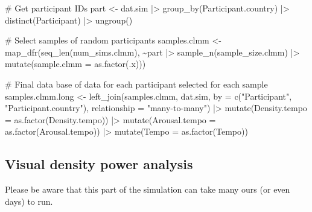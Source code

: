 \documentclass[
  bookmarksnumbered]{article}
\newenvironment{Shaded}{\begin{snugshade}}{\end{snugshade}}
\newcommand{\AttributeTok}[1]{\textcolor[rgb]{0.80,0.80,0.80}{#1}}
\newcommand{\CommentTok}[1]{\textcolor[rgb]{0.50,0.62,0.50}{#1}}
\newcommand{\FunctionTok}[1]{\textcolor[rgb]{0.94,0.94,0.56}{#1}}
\newcommand{\NormalTok}[1]{\textcolor[rgb]{0.80,0.80,0.80}{#1}}
\newcommand{\OtherTok}[1]{\textcolor[rgb]{0.94,0.94,0.56}{#1}}
\newcommand{\SpecialCharTok}[1]{\textcolor[rgb]{0.86,0.64,0.64}{#1}}
\newcommand{\StringTok}[1]{\textcolor[rgb]{0.80,0.58,0.58}{#1}}
\begin{document}
\begin{Shaded}
\begin{Highlighting}[]
\CommentTok{\# Get participant IDs}
\NormalTok{part }\OtherTok{\textless{}{-}}\NormalTok{ dat.sim  }\SpecialCharTok{|\textgreater{}} 
  \FunctionTok{group\_by}\NormalTok{(Participant.country) }\SpecialCharTok{|\textgreater{}}
  \FunctionTok{distinct}\NormalTok{(Participant) }\SpecialCharTok{|\textgreater{}}
  \FunctionTok{ungroup}\NormalTok{()}

\CommentTok{\# Select samples of random participants }
\NormalTok{samples.clmm }\OtherTok{\textless{}{-}} \FunctionTok{map\_dfr}\NormalTok{(}\FunctionTok{seq\_len}\NormalTok{(num\_sims.clmm), }\SpecialCharTok{\textasciitilde{}}\NormalTok{part }\SpecialCharTok{|\textgreater{}}
                        \FunctionTok{sample\_n}\NormalTok{(sample\_size.clmm) }\SpecialCharTok{|\textgreater{}}
                        \FunctionTok{mutate}\NormalTok{(}\AttributeTok{sample.clmm =} \FunctionTok{as.factor}\NormalTok{(.x)))}

\CommentTok{\# Final data base of data for each participant selected for each sample}
\NormalTok{samples.clmm.long }\OtherTok{\textless{}{-}} \FunctionTok{left\_join}\NormalTok{(samples.clmm, dat.sim, }\AttributeTok{by =} \FunctionTok{c}\NormalTok{(}\StringTok{"Participant"}\NormalTok{, }
                                                             \StringTok{"Participant.country"}\NormalTok{),}
                                \AttributeTok{relationship =} \StringTok{"many{-}to{-}many"}\NormalTok{) }\SpecialCharTok{|\textgreater{}}
  \FunctionTok{mutate}\NormalTok{(}\AttributeTok{Density.tempo =} \FunctionTok{as.factor}\NormalTok{(Density.tempo)) }\SpecialCharTok{|\textgreater{}}
  \FunctionTok{mutate}\NormalTok{(}\AttributeTok{Arousal.tempo =} \FunctionTok{as.factor}\NormalTok{(Arousal.tempo)) }\SpecialCharTok{|\textgreater{}}
  \FunctionTok{mutate}\NormalTok{(}\AttributeTok{Tempo =} \FunctionTok{as.factor}\NormalTok{(Tempo))}
\end{Highlighting}
\end{Shaded}

\hypertarget{visual-density-power-analysis}{%
\subsection{Visual density power analysis}\label{visual-density-power-analysis}}

Please be aware that this part of the simulation can take many ours (or even days) to run.
\end{document}
